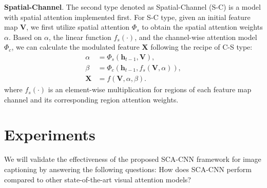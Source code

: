 \documentclass[10pt,twocolumn,letterpaper]{article}
\begin{document}
\textbf{Spatial-Channel}. The second type denoted as Spatial-Channel (S-C) is a model with spatial attention implemented first. For S-C type, given an initial
feature map $\mathbf{V}$, we first utilize spatial attention $\Phi_s$ to obtain the spatial attention weights $\alpha$. Based on $\alpha$, the linear function
$f_s(\cdot)$, and the channel-wise attention model $\Phi_c$, we can calculate the modulated feature $\mathbf{X}$ following the recipe of C-S type:
\begin{equation} \label{equ:S-C}
\begin{split}
\alpha &= \Phi_s \left(\mathbf{h}_{t-1}, \mathbf{V} \right), \\
\beta &= \Phi_c \left(\mathbf{h}_{t-1}, f_s \left(\mathbf{V}, \alpha \right) \right), \\
\mathbf{X} &= f \left(\mathbf{V}, \alpha, \beta \right).
\end{split}
\end{equation}
where $f_s(\cdot)$ is an element-wise multiplication for regions of each feature map channel and its corresponding region attention weights.

\section{Experiments}
We will validate the effectiveness of the proposed SCA-CNN framework for image captioning by answering the following questions:
How does SCA-CNN perform compared to other state-of-the-art visual attention models?
\end{document}
